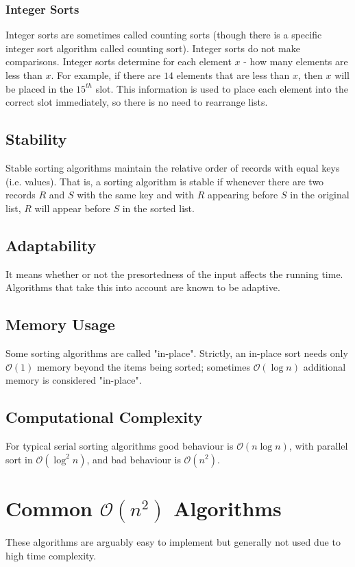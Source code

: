 \documentclass[twoside,12pt,a4paper,english]{book}
\theoremstyle{definition}
\theoremstyle{problemstyle}
\begin{document}
\subsubsection{Integer Sorts}
Integer sorts are sometimes called counting sorts (though there is a specific integer sort algorithm called counting sort). Integer sorts do not make comparisons. Integer sorts determine for each element $x$ - how many elements are less than $x$. For example, if there are $14$ elements that are less than $x$, then $x$ will be placed in the $15^{th}$ slot. This information is used to place each element into the correct slot immediately, so there is no need to rearrange lists.
\subsection{Stability}
Stable sorting algorithms maintain the relative order of records with equal keys (i.e. values). That is, a sorting algorithm is stable if whenever there are two records $R$ and $S$ with the same key and with $R$ appearing before $S$ in the original list, $R$ will appear before $S$ in the sorted list.
\subsection{Adaptability}
It means whether or not the presortedness of the input affects the running time. Algorithms that take this into account are known to be adaptive.
\subsection{Memory Usage}
Some sorting algorithms are called "in-place". Strictly, an in-place sort needs only $\mathcal{O}(1)$ memory beyond the items being sorted; sometimes $\mathcal{O}(\log{n})$ additional memory is considered "in-place".
\subsection{Computational Complexity}
For typical serial sorting algorithms good behaviour is $\mathcal{O}(n\log{n})$, with parallel sort in $\mathcal{O}(\log^{2}{n})$, and bad behaviour is $\mathcal{O}(n^2)$.
\section{Common $\mathcal{O}(n^2)$ Algorithms}
These algorithms are arguably easy to implement but generally not used due to high time complexity.
\end{document}
